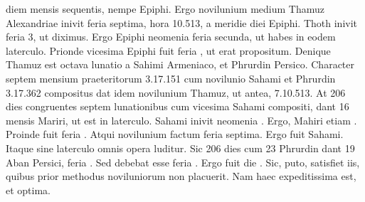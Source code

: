 diem mensis sequentis, nempe Epiphi.
Ergo novilunium medium
Thamuz Alexandriae inivit feria septima, hora 10.513, a meridie 
diei Epiphi.
Thoth inivit feria 3, ut diximus.
Ergo Epiphi neomenia
feria secunda, ut habes in eodem laterculo. %
Prionde vicesima Epiphi
fuit feria , ut erat propositum.
Denique Thamuz est octava lunatio
a Sahimi Armeniaco, et Phrurdin Persico.
Character septem mensium
praeteritorum 3.17.151 cum novilunio Sahami et Phrurdin 3.17.362
compositus dat idem novilunium Thamuz, ut antea, 7.10.513.
At 206 dies congruentes septem lunationibus cum vicesima Sahami
compositi, dant 16 mensis Mariri, ut est in laterculo.
Sahami inivit
neomenia .
Ergo, Mahiri etiam .
Proinde  fuit feria .
Atqui novilunium factum feria septima.
Ergo fuit  Sahami.
Itaque
sine laterculo omnis opera luditur.
Sic 206 dies cum 23 Phrurdin
dant 19 Aban Persici, feria .
Sed debebat esse feria .
Ergo fuit
die .
Sic, puto, satisfiet iis, quibus prior methodus noviluniorum
non placuerit.
Nam haec expeditissima est, et optima.
%
